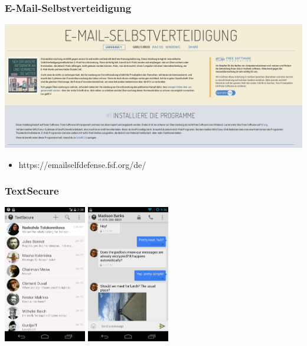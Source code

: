 \documentclass[12pt]{beamer}
\begin{document}
\begin{frame}
  \frametitle{E-Mail-Selbstverteidigung}
  \begin{center}
    \includegraphics[height=0.5\textheight]{img/emailselfdefense.png}
    \begin{itemize}
      \item https://emailselfdefense.fsf.org/de/
    \end{itemize}	
  \end{center}	
\end{frame}

\begin{frame}
  \frametitle{TextSecure}
    \begin{center}
      \includegraphics[height=6cm]{img/textsecure1.png}
      \hspace{0.5cm}
      \includegraphics[height=6cm]{img/textsecure2.png}
    \end{center}
\end{frame}
\end{document}
